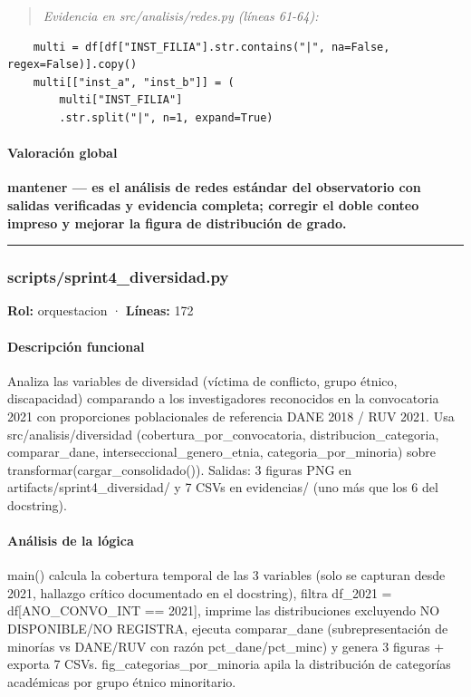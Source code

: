 \begin{tcolorbox}[riesgo]
\begin{itemize}
\begin{quote}\footnotesize\ttfamily
\noindent\emph{Evidencia en src/analisis/redes.py (líneas 61-64):}
\end{quote}
\begin{lstlisting}
    multi = df[df["INST_FILIA"].str.contains("|", na=False, regex=False)].copy()
    multi[["inst_a", "inst_b"]] = (
        multi["INST_FILIA"]
        .str.split("|", n=1, expand=True)
\end{lstlisting}

\end{itemize}
\end{tcolorbox}

\paragraph{Valoración global}
\textbf{mantener --- es el análisis de redes estándar del observatorio con salidas verificadas y evidencia completa; corregir el doble conteo impreso y mejorar la figura de distribución de grado.}

\medskip
\hrule

\subsubsection{scripts/sprint4\_diversidad.py}
\textbf{Rol:} orquestacion · \textbf{Líneas:} 172

\paragraph{Descripción funcional}
Analiza las variables de diversidad (víctima de conflicto, grupo étnico, discapacidad) comparando a los investigadores reconocidos en la convocatoria 2021 con proporciones poblacionales de referencia DANE 2018 / RUV 2021. Usa src/analisis/diversidad (cobertura\_por\_convocatoria, distribucion\_categoria, comparar\_dane, interseccional\_genero\_etnia, categoria\_por\_minoria) sobre transformar(cargar\_consolidado()). Salidas: 3 figuras PNG en artifacts/sprint4\_diversidad/ y 7 CSVs en evidencias/ (uno más que los 6 del docstring).

\paragraph{Análisis de la lógica}
main() calcula la cobertura temporal de las 3 variables (solo se capturan desde 2021, hallazgo crítico documentado en el docstring), filtra df\_2021 = df[ANO\_CONVO\_INT == 2021], imprime las distribuciones excluyendo NO DISPONIBLE/NO REGISTRA, ejecuta comparar\_dane (subrepresentación de minorías vs DANE/RUV con razón pct\_dane/pct\_minc) y genera 3 figuras + exporta 7 CSVs. fig\_categorias\_por\_minoria apila la distribución de categorías académicas por grupo étnico minoritario.

